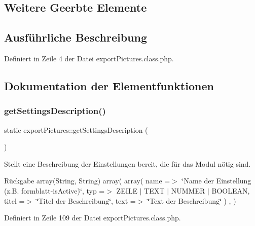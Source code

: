 \subsection*{Weitere Geerbte Elemente}


\subsection{Ausführliche Beschreibung}


Definiert in Zeile 4 der Datei export\+Pictures.\+class.\+php.



\subsection{Dokumentation der Elementfunktionen}
\mbox{\label{classexport_pictures_ac849698213f23ed2f6ae5e175eec21b8}} 
\subsubsection{\texorpdfstring{get\+Settings\+Description()}{getSettingsDescription()}}
{\footnotesize\ttfamily static export\+Pictures\+::get\+Settings\+Description (\begin{DoxyParamCaption}{ }\end{DoxyParamCaption})\hspace{0.3cm}{\ttfamily [static]}}

Stellt eine Beschreibung der Einstellungen bereit, die für das Modul nötig sind. \begin{DoxyReturn}{Rückgabe}
array(\+String, String) array( array( \textquotesingle{}name\textquotesingle{} =$>$ \char`\"{}\+Name der Einstellung (z.\+B. formblatt-\/is\+Active)\char`\"{}, \textquotesingle{}typ\textquotesingle{} =$>$ Z\+E\+I\+LE $\vert$ T\+E\+XT $\vert$ N\+U\+M\+M\+ER $\vert$ B\+O\+O\+L\+E\+AN, \textquotesingle{}titel\textquotesingle{} =$>$ \char`\"{}\+Titel der Beschreibung\char`\"{}, \textquotesingle{}text\textquotesingle{} =$>$ \char`\"{}\+Text der Beschreibung\char`\"{} ) , ) 
\end{DoxyReturn}


Definiert in Zeile 109 der Datei export\+Pictures.\+class.\+php.

\mbox{\label{classexport_pictures_a39ef5f34f14334d6b7e51bfb8ec4c13f}} 
